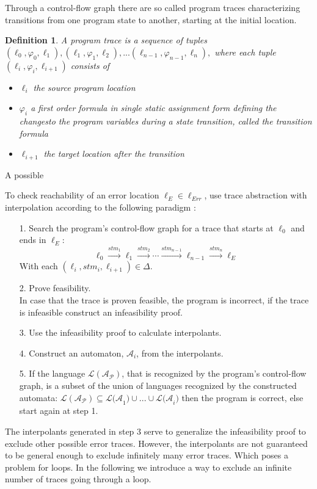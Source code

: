 \documentclass{article}
\newtheorem{mydef}{Definition}
\begin{document}
Through a control-flow graph there are so called program traces characterizing transitions from one program state to another, starting at the initial location. \\

\begin{mydef}
	A program trace is a sequence of tuples $(\ell_0, \varphi_0, \ell_1), (\ell_1, \varphi_1, \ell_2), ... (\ell_{n - 1}, \varphi_{n - 1}, \ell_n),$ where each tuple $(\ell_i, \varphi_i, \ell_{i + 1})$ consists of
	\begin{itemize}
		\item $\ell_i$ the source program location
		\item $\varphi_i$ a first order formula in single static assignment form defining the changesto the program variables during a state transition, called the transition formula
		\item  $\ell_{i+1}$ the target location after the transition
	\end{itemize}
\end{mydef}

A possible 

 To check reachability of an error location $\ell_E \in \ell_{Err}$, use trace abstraction with interpolation according to the following paradigm \cite{10.1007/978-3-642-03237-0_7}:
\begin{itemize}
	\item[1.] Search the program's control-flow graph for a trace that starts at $\ell_0$ and ends in $\ell_E$:
	\begin{equation*}
			 \ell_{0} \xrightarrow{\text{$stm_1$}} \ell_1 \xrightarrow{\text{$stm_2$}} \cdots \xrightarrow{\text{$stm_{n-1}$}} \ell_{n-1} \xrightarrow{\text{$stm_{n}$}} \ell_{E}
	\end{equation*}
	With each $(\ell_i, stm_i, \ell_{i + 1}) \in \Delta$.
	\item[2.] Prove feasibility. \\ In case that the trace is proven feasible, the program is incorrect, if the trace is infeasible construct an infeasibility proof.
	\item[3.] Use the infeasibility proof to calculate interpolants.
	\item[4.] Construct an automaton, $\mathcal{A}_i$, from the interpolants.
	\item[5.] If the language $\mathcal{L(A_P)}$, that is recognized by the program's control-flow graph, is a subset of the union of languages recognized by the constructed automata: $\mathcal{L(A_P)} \subseteq \mathcal{L(A}_1) \cup ... \cup \mathcal{L(A}_i)$ then the program is correct, else start again at step 1.
\end{itemize}
The interpolants generated in step 3 serve to generalize the infeasibility proof to exclude other possible error traces. However, the interpolants are not guaranteed to be general enough to exclude infinitely many error traces. Which poses a problem for loops. In the following we introduce a way to exclude an infinite number of traces going through a loop.
\end{document}
